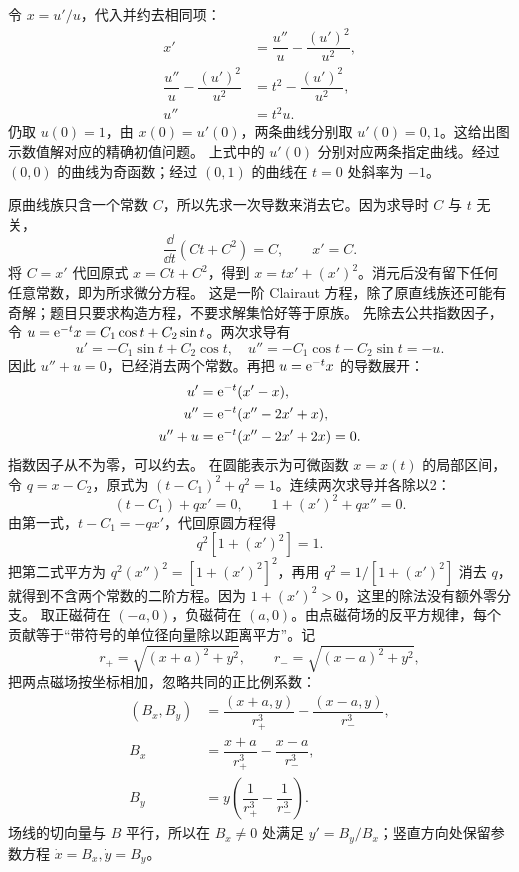 令 $x=u'/u$，代入并约去相同项：
\[
\begin{aligned}
x'&=\dfrac{u''}{u}-\dfrac{(u')^2}{u^2},\\
\dfrac{u''}{u}-\dfrac{(u')^2}{u^2}&=t^2-\dfrac{(u')^2}{u^2},\\
u''&=t^2u.
\end{aligned}
\]
仍取 $u(0)=1$，由 $x(0)=u'(0)$，两条曲线分别取 $u'(0)=0,1$。这给出图示数值解对应的精确初值问题。
上式中的 $u'(0)$ 分别对应两条指定曲线。经过 $(0,0)$ 的曲线为奇函数；经过 $(0,1)$ 的曲线在 $t=0$ 处斜率为 $-1$。

原曲线族只含一个常数 $C$，所以先求一次导数来消去它。因为求导时 $C$ 与 $t$ 无关，
\[
\dfrac\dd{\dd t}(Ct+C^2)=C,\qquad x'=C.
\]
将 $C=x'$ 代回原式 $x=Ct+C^2$，得到 $x=tx'+(x')^2$。消元后没有留下任何任意常数，即为所求微分方程。
这是一阶 Clairaut 方程，除了原直线族还可能有奇解；题目只要求构造方程，不要求解集恰好等于原族。
先除去公共指数因子，令 $u=\mathrm e^{-t}x=C_1\cos t+C_2\sin t$。两次求导有
\[
u'=-C_1\sin t+C_2\cos t,\quad
u''=-C_1\cos t-C_2\sin t=-u.
\]
因此 $u''+u=0$，已经消去两个常数。再把 $u=\mathrm e^{-t}x$ 的导数展开：
\[
\begin{aligned}
u'&=\mathrm e^{-t}(x'-x),\\
u''&=\mathrm e^{-t}(x''-2x'+x),\\
u''+u&=\mathrm e^{-t}(x''-2x'+2x)=0.
\end{aligned}
\]
指数因子从不为零，可以约去。
在圆能表示为可微函数 $x=x(t)$ 的局部区间，令 $q=x-C_2$，原式为 $(t-C_1)^2+q^2=1$。连续两次求导并各除以2：
\[
(t-C_1)+qx'=0,\qquad 1+(x')^2+qx''=0.
\]
由第一式，$t-C_1=-qx'$，代回原圆方程得
\[
q^2[1+(x')^2]=1.
\]
把第二式平方为 $q^2(x'')^2=[1+(x')^2]^2$，再用 $q^2=1/[1+(x')^2]$ 消去 $q$，就得到不含两个常数的二阶方程。因为 $1+(x')^2>0$，这里的除法没有额外零分支。
取正磁荷在 $(-a,0)$，负磁荷在 $(a,0)$。由点磁荷场的反平方规律，每个贡献等于“带符号的单位径向量除以距离平方”。记
\[
r_+=\sqrt{(x+a)^2+y^2},\qquad r_-=\sqrt{(x-a)^2+y^2},
\]
把两点磁场按坐标相加，忽略共同的正比例系数：
\[
\begin{aligned}
(B_x,B_y)&=\dfrac{(x+a,y)}{r_+^3}-\dfrac{(x-a,y)}{r_-^3},\\
B_x&=\dfrac{x+a}{r_+^3}-\dfrac{x-a}{r_-^3},\\
B_y&=y\left(\dfrac1{r_+^3}-\dfrac1{r_-^3}\right).
\end{aligned}
\]
场线的切向量与 $B$ 平行，所以在 $B_x\ne0$ 处满足 $y'=B_y/B_x$；竖直方向处保留参数方程 $\dot x=B_x,\dot y=B_y$。

